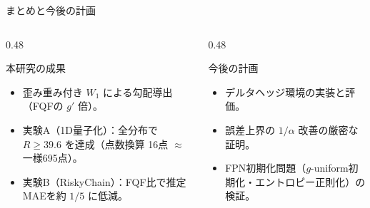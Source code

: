 \documentclass[aspectratio=169, 11pt]{beamer}
\begin{document}
\begin{frame}{まとめと今後の計画}
  \begin{columns}[T]
    \begin{column}{0.48\textwidth}
      \begin{block}{本研究の成果}
        \begin{itemize}\setlength{\itemsep}{3pt}
          \item 歪み重み付き $W_1$ による勾配導出（FQFの $g'$ 倍）。
          \item 実験A（1D量子化）：全分布で $R \ge 39.6$ を達成（点数換算 16点 $\approx$ 一様695点）。
          \item 実験B（RiskyChain）：FQF比で推定MAEを約 $1/5$ に低減。
        \end{itemize}
      \end{block}
    \end{column}
    \begin{column}{0.48\textwidth}
      \begin{exampleblock}{今後の計画}
        \begin{itemize}\setlength{\itemsep}{3pt}
          \item デルタヘッジ環境の実装と評価。
          \item 誤差上界の $1/\alpha$ 改善の厳密な証明。
          \item FPN初期化問題（$g$-uniform初期化・エントロピー正則化）の検証。
        \end{itemize}
      \end{exampleblock}
    \end{column}
  \end{columns}
\end{frame}
\end{document}
